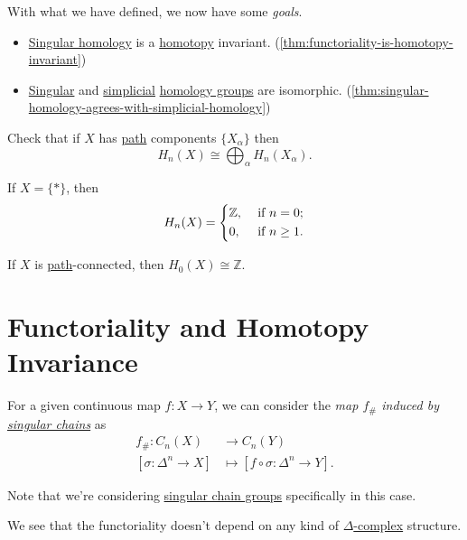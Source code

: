 With what we have defined, we now have some \emph{goals}.
\begin{itemize}
	\item \hyperref[def:singular-homology-group]{Singular homology} is a \hyperref[def:homotopy]{homotopy} invariant. (\autoref{thm:functoriality-is-homotopy-invariant})
	\item \hyperref[def:singular-homology-group]{Singular} and \hyperref[def:simplicial-homology-group]{simplicial} \hyperref[def:homology-group]{homology groups} are isomorphic. (\autoref{thm:singular-homology-agrees-with-simplicial-homology})
\end{itemize}

\begin{exercise}
	Check that if \(X\) has \hyperref[def:path]{path} components \(\{X_\alpha\}\) then
	\[
		H_n(X) \cong \bigoplus_\alpha H_n(X_\alpha).
	\]
\end{exercise}
\begin{exercise}
	If \(X = \{\ast\}\), then
	\[
		H_n(X) = \begin{dcases}
			\mathbb{Z}, & \text{ if } n=0 ;     \\
			0,          & \text{ if } n\geq 1 .
		\end{dcases}
	\]
\end{exercise}
\begin{exercise}
	If \(X\) is \hyperref[def:path]{path}-connected, then \(H_0(X) \cong \mathbb{Z}\).
\end{exercise}

\section{Functoriality and Homotopy Invariance}
\begin{definition}\label{def:induced-map-on-singular-chain}
	For a given continuous map \(f \colon X \to Y\), we can consider the \emph{map \(f_{\#}\) induced by \hyperref[def:singular-chain-group]{singular chains}} as
	\[
		\begin{split}
			f_{\#} \colon C_n(X)           & \to C_n(Y)                                      \\
			[\sigma \colon \Delta^n \to X] & \mapsto [f \circ \sigma \colon \Delta^n \to Y].
		\end{split}
	\]
\end{definition}
\begin{note}
	Note that we're considering \hyperref[def:singular-chain-group]{singular chain groups} specifically in this case.
\end{note}
\begin{remark}
	We see that the functoriality doesn't depend on any kind of \hyperref[def:delta-complex]{\(\Delta \)-complex} structure.
\end{remark}

